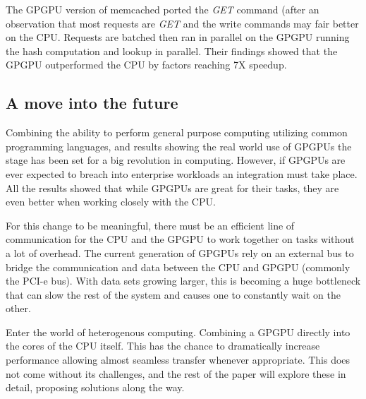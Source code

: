 The GPGPU version of memcached ported the \textit{GET} command (after an observation that most requests are \textit{GET} and the write commands may fair better on the CPU. Requests are batched then ran in parallel on the GPGPU running the hash computation and lookup in parallel. Their findings showed that the GPGPU outperformed the CPU by factors reaching 7X speedup. \cite{memcached}


\subsection*{A move into the future}

Combining the ability to perform general purpose computing utilizing common programming languages, and results showing the real world use of GPGPUs the stage has been set for a big revolution in computing. However, if GPGPUs are ever expected to breach into enterprise workloads an integration must take place. All the results showed that while GPGPUs are great for their tasks, they are even better when working closely with the CPU. 

For this change to be meaningful, there must be an efficient line of communication for the CPU and the GPGPU to work together on tasks without a lot of overhead. The current generation of GPGPUs rely on an external bus to bridge the communication and data between the CPU and GPGPU (commonly the PCI-e bus). With data sets growing larger, this is becoming a huge bottleneck that can slow the rest of the system and causes one to constantly wait on the other.

Enter the world of heterogenous computing. Combining a GPGPU directly into the cores of the CPU itself. This has the chance to dramatically increase performance allowing almost seamless transfer whenever appropriate. This does not come without its challenges, and the rest of the paper will explore these in detail, proposing solutions along the way. 












